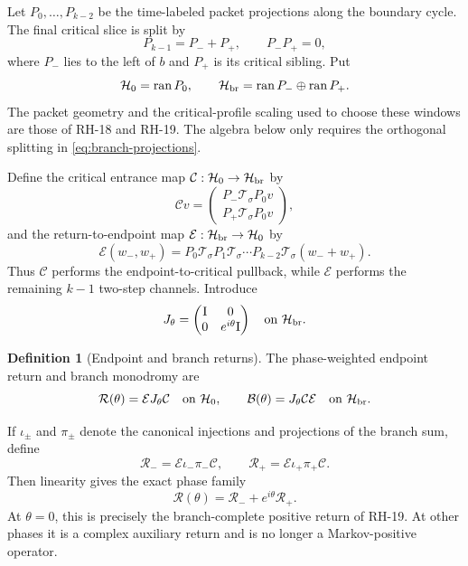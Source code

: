 \documentclass[11pt]{article}
\theoremstyle{definition}
\newtheorem{definition}[theorem]{Definition}
\theoremstyle{remark}
\newcommand{\Id}{\mathrm I}
\newcommand{\cT}{\mathcal T}
\newcommand{\cR}{\mathcal R}
\newcommand{\cB}{\mathcal B}
\newcommand{\cC}{\mathcal C}
\newcommand{\cE}{\mathcal E}
\newcommand{\cH}{\mathcal H}
\begin{document}
Let $P_0,\ldots,P_{k-2}$ be the time-labeled packet projections along the
boundary cycle.  The final critical slice is split by
\begin{equation}\label{eq:branch-projections}
 P_{k-1}=P_-+P_+,
 \qquad P_-P_+=0,
\end{equation}
where $P_-$ lies to the left of $b$ and $P_+$ is its critical sibling.  Put
\begin{equation}\label{eq:spaces}
 \cH_0=\operatorname{ran}P_0,
 \qquad
 \cH_{\rm br}=\operatorname{ran}P_-\oplus\operatorname{ran}P_+.
\end{equation}
The packet geometry and the critical-profile scaling used to choose these
windows are those of RH-18 and RH-19.  The algebra below only requires the
orthogonal splitting in \eqref{eq:branch-projections}.

Define the critical entrance map $\cC:\cH_0\to\cH_{\rm br}$ by
\begin{equation}\label{eq:entrance-map}
 \cC v=
 \begin{pmatrix}P_-\cT_\sigma P_0v\\ P_+\cT_\sigma P_0v\end{pmatrix},
\end{equation}
and the return-to-endpoint map $\cE:\cH_{\rm br}\to\cH_0$ by
\begin{equation}\label{eq:exit-map}
 \cE(w_-,w_+)
 =P_0\cT_\sigma P_1\cT_\sigma\cdots
 P_{k-2}\cT_\sigma(w_-+w_+).
\end{equation}
Thus $\cC$ performs the endpoint-to-critical pullback, while $\cE$ performs
the remaining $k-1$ two-step channels.  Introduce
\begin{equation}\label{eq:J-theta}
 J_\theta=
 \begin{pmatrix}\Id&0\\0&e^{i\theta}\Id\end{pmatrix}
 \quad\text{on }\cH_{\rm br}.
\end{equation}

\begin{definition}[Endpoint and branch returns]
\label{def:returns}
The phase-weighted endpoint return and branch monodromy are
\begin{equation}\label{eq:return-definitions}
 \cR(\theta)=\cE J_\theta\cC
 \quad\text{on }\cH_0,
 \qquad
 \cB(\theta)=J_\theta\cC\cE
 \quad\text{on }\cH_{\rm br}.
\end{equation}
\end{definition}

If $\iota_\pm$ and $\pi_\pm$ denote the canonical injections and projections
of the branch sum, define
\begin{equation}\label{eq:single-branch-returns}
 \cR_-=\cE\iota_-\pi_-\cC,
 \qquad
 \cR_+=\cE\iota_+\pi_+\cC.
\end{equation}
Then linearity gives the exact phase family
\begin{equation}\label{eq:phase-family}
 \boxed{\cR(\theta)=\cR_-+e^{i\theta}\cR_+.}
\end{equation}
At $\theta=0$, this is precisely the branch-complete positive return of
RH-19.  At other phases it is a complex auxiliary return and is no longer a
Markov-positive operator.
\end{document}
